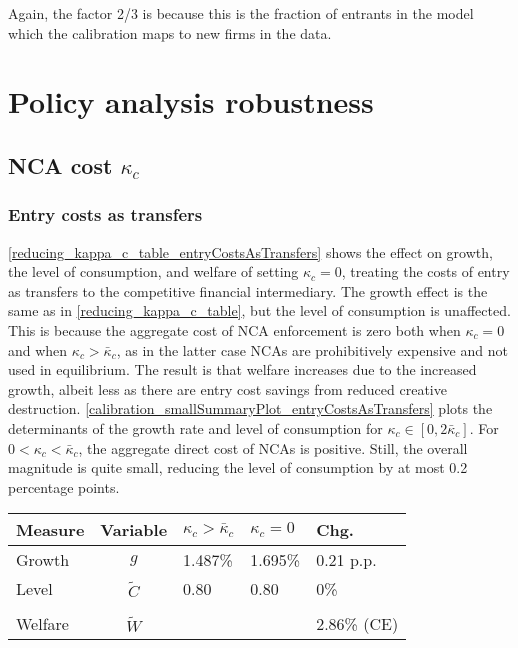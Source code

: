 \documentclass[11pt,english]{article}
\theoremstyle{definition}
\begin{document}
Again, the factor 2/3 is because this is the fraction of entrants in the model which the calibration maps to new firms in the data.

\section{Policy analysis robustness}

\subsection{NCA cost $\kappa_c$}\label{appendix:policyanalysis:ncacost}

\subsubsection{Entry costs as transfers}

\autoref{reducing_kappa_c_table_entryCostsAsTransfers} shows the effect on growth, the level of consumption, and welfare of setting $\kappa_c = 0$, treating the costs of entry as transfers to the competitive financial intermediary. The growth effect is the same as in \autoref{reducing_kappa_c_table}, but the level of consumption is unaffected. This is because the aggregate cost of NCA enforcement is zero both when $\kappa_c = 0$ and when $\kappa_c > \bar{\kappa}_c$, as in the latter case NCAs are prohibitively expensive and not used in equilibrium. The result is that welfare increases due to the increased growth, albeit less as there are entry cost savings from reduced creative destruction. \autoref{calibration_smallSummaryPlot_entryCostsAsTransfers} plots the determinants of the growth rate and level of consumption for $\kappa_c \in [0, 2\bar{\kappa}_c]$. For $0 < \kappa_c < \bar{\kappa}_c$, the aggregate direct cost of NCAs is positive. Still, the overall magnitude is quite small, reducing the level of consumption by at most 0.2 percentage points.

\begin{table}
	\centering
	\label{reducing_kappa_c_table_entryCostsAsTransfers}
	\begin{tabular}{lclll}
		\toprule \toprule
		Measure & Variable & $\kappa_c > \bar{\kappa}_c$ & $\kappa_c = 0$ & Chg. \tabularnewline
		\midrule
		Growth & $g$ & 1.487\% & 1.695\% & 0.21 p.p. \tabularnewline
		Level & $\tilde{C}$  & 0.80 &  0.80 & 0\% \tabularnewline 
		\tabularnewline
		Welfare & $\tilde{W}$  &  & & 2.86\% (CE)  \tabularnewline
		\bottomrule
	\end{tabular}
\end{table}
\end{document}
